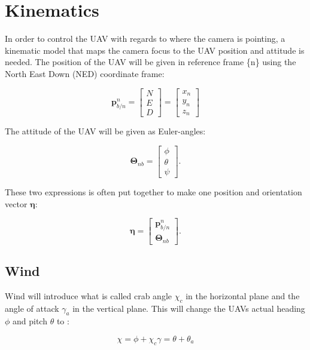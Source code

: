 \section{Kinematics}
In order to control the UAV with regards to where the camera is pointing, a kinematic model that maps the camera focus to the UAV position and attitude is needed. The position of the UAV will be given in reference frame \{n\} using the North East Down (NED) coordinate frame:

\begin{equation}
	\bm{p}_{b/n}^n =
	\begin{bmatrix}
		N \\ E \\ D
	\end{bmatrix}
	=
	\begin{bmatrix}
		x_n \\ y_n \\ z_n
	\end{bmatrix}
\end{equation}

The attitude of the UAV will be given as Euler-angles:

\begin{equation}
	\bm{\Theta}_{nb} = 
	\begin{bmatrix}
		\phi \\ \theta \\ \psi
	\end{bmatrix}.
\end{equation}
	
These two expressions is often put together to make one position and orientation vector $\bm{\eta}$:

\begin{equation}
	\bm{\eta} =
	\begin{bmatrix}
		\bm{p}_{b/n}^n \\
		\bm{\Theta}_{nb}
	\end{bmatrix}.
\end{equation}
	
\subsection{Wind}
Wind will introduce what is called crab angle $\chi_c$ in the horizontal plane and the angle of attack $\gamma_a$ in the vertical plane. This will change the UAVs actual heading $\phi$ and pitch $\theta$ to \cite{suaBEARD}:

\begin{subequations}
\begin{equation}
	\chi = \phi + \chi_c
\end{equation}
\begin{equation}
	\gamma = \theta + \theta_a
\end{equation}
\end{subequations}

